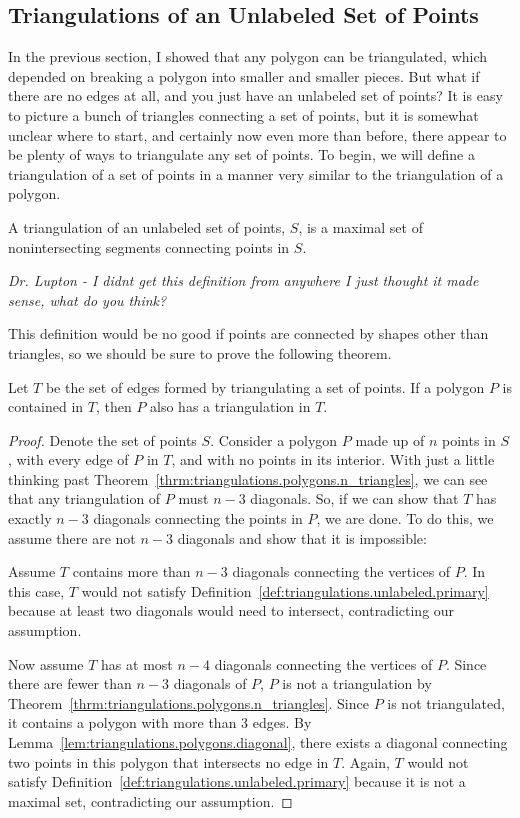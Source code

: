 \subsection{Triangulations of an Unlabeled Set of Points}

In the previous section, I showed that any polygon can be triangulated, which depended on breaking a polygon into smaller and smaller pieces.
But what if there are no edges at all, and you just have an unlabeled set of points?
It is easy to picture a bunch of triangles connecting a set of points, but it is somewhat unclear where to start, and certainly now even more than before, there appear to be plenty of ways to triangulate any set of points.
To begin, we will define a triangulation of a set of points in a manner very similar to the triangulation of a polygon.

\begin{definition}
	A triangulation of an unlabeled set of points, $S$, is a maximal set of nonintersecting segments connecting points in $S$.
	\label{def:triangulations.unlabeled.primary}
\end{definition}

\textit{Dr. Lupton - I didnt get this definition from anywhere I just thought it made sense, what do you think?}

This definition would be no good if points are connected by shapes other than triangles, so we should be sure to prove the following theorem.
\begin{theorem}
	Let $T$ be the set of edges formed by triangulating a set of points.
	If a polygon $P$ is contained in $T$, then $P$ also has a triangulation in $T$.
\end{theorem}
\begin{proof}
	Denote the set of points $S$.
	Consider a polygon $P$ made up of $n$ points in $S$, with every edge of $P$ in $T$, and with no points in its interior.
	With just a little thinking past Theorem~\ref{thrm:triangulations.polygons.n_triangles}, we can see that any triangulation of $P$ must $n-3$ diagonals.
	So, if we can show that $T$ has exactly $n-3$ diagonals connecting the points in $P$, we are done.
	To do this, we assume there are not $n-3$ diagonals and show that it is impossible:

	Assume $T$ contains more than $n-3$ diagonals connecting the vertices of $P$.
	In this case, $T$ would not satisfy Definition~\ref{def:triangulations.unlabeled.primary} because at least two diagonals would need to intersect, contradicting our assumption.

	Now assume $T$ has at most $n-4$ diagonals connecting the vertices of $P$.
	Since there are fewer than $n-3$ diagonals of $P$, $P$ is not a triangulation by Theorem~\ref{thrm:triangulations.polygons.n_triangles}.
	Since $P$ is not triangulated, it contains a polygon with more than 3 edges.
	By Lemma~\ref{lem:triangulations.polygons.diagonal}, there exists a diagonal connecting two points in this polygon that intersects no edge in $T$.
	Again, $T$ would not satisfy Definition~\ref{def:triangulations.unlabeled.primary} because it is not a maximal set, contradicting our assumption.
\end{proof}


